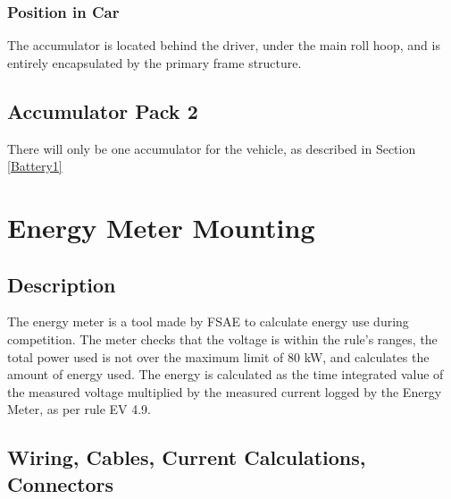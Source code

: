\documentclass{article}
\begin{document}
        \subsubsection{Position in Car}

        The accumulator is located behind the driver, under the main roll hoop, and is entirely encapsulated by the primary frame structure.

    \subsection{Accumulator Pack 2}
        There will only be one accumulator for the vehicle, as described in Section \ref{Battery1}

\newpage



\section{Energy Meter Mounting}

    \subsection{Description}


        The energy meter is a tool made by FSAE to calculate energy use during competition. The meter checks that the voltage is within the rule's ranges, the total power used is not over the maximum limit of 80 kW, and calculates the amount of energy used. The energy is calculated as the time integrated value of the measured voltage multiplied by the measured current logged by the Energy Meter, as per rule EV 4.9.

    \subsection{Wiring, Cables, Current Calculations, Connectors}

\end{document}
